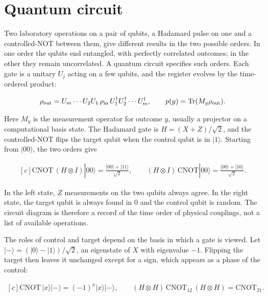 \documentclass[11pt,oneside]{book}
\newenvironment{centeredalign}{\[\begin{gathered}[c]}{\end{gathered}\]}
\begin{document}
\clearpage

\section{Quantum circuit}

\label{topic:quantum-circuit}

Two laboratory operations on a pair of qubits, a Hadamard pulse on one and a controlled-NOT between them, give different results in the two possible orders. In one order the qubits end entangled, with perfectly correlated outcomes; in the other they remain uncorrelated. A quantum circuit specifies such orders. Each gate is a unitary \(U_j\) acting on a few qubits, and the register evolves by the time-ordered product:

\begin{centeredalign}
\rho_{\rm out}=U_m\cdots U_2U_1\,\rho_{\rm in}\,U_1^\dagger U_2^\dagger\cdots U_m^\dagger,
\qquad p(y)=\operatorname{Tr}(M_y\rho_{\rm out}).
\end{centeredalign}

Here \(M_y\) is the measurement operator for outcome \(y\), usually a projector on a computational basis state. The Hadamard gate is \(H=(X+Z)/\sqrt2\), and the controlled-NOT flips the target qubit when the control qubit is in \(|1\rangle\). Starting from \(|00\rangle\), the two orders give

\begin{centeredalign}
\mathrm{CNOT}\,(H\otimes I)|00\rangle=\frac{|00\rangle+|11\rangle}{\sqrt2},\qquad
(H\otimes I)\,\mathrm{CNOT}|00\rangle=\frac{|00\rangle+|10\rangle}{\sqrt2}.
\end{centeredalign}

In the left state, \(Z\) measurements on the two qubits always agree. In the right state, the target qubit is always found in \(0\) and the control qubit is random. The circuit diagram is therefore a record of the time order of physical couplings, not a list of available operations.

The roles of control and target depend on the basis in which a gate is viewed. Let \(|-\rangle=(|0\rangle-|1\rangle)/\sqrt2\), an eigenstate of \(X\) with eigenvalue \(-1\). Flipping the target then leaves it unchanged except for a sign, which appears as a phase of the control:

\begin{centeredalign}
\mathrm{CNOT}\,|x\rangle|-\rangle=(-1)^x|x\rangle|-\rangle,\qquad
(H\otimes H)\,\mathrm{CNOT}_{12}\,(H\otimes H)=\mathrm{CNOT}_{21}.
\end{centeredalign}
\end{document}
